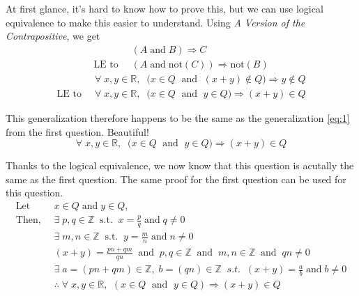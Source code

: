 At first glance, it's hard to know
how to prove this, but we can use
logical equivalence to make this
easier to understand.
Using \textit{A Version of the Contrapositive},
we get
\begin{align}
	&(A \; \text{and} \; B) \Rightarrow C
	\\
	\text{LE to} \;\;
	&(A \; \text{and} \; \text{not}(C)) \Rightarrow
	\text{not}(B)
\end{align}
\begin{align}
	&\forall \;
	x,y \in \mathbb{R}, \; \;
	\big( x \in Q \; \text{ and } \; (x + y) \notin Q \big)
	\Rightarrow
	y \notin Q
	\\
	\text{LE to} \;\;
	&\forall \;
	x,y \in \mathbb{R}, \; \;
	\big( x \in Q \; \text{ and } \; y \in Q \big)
	\Rightarrow
	(x + y) \in Q
\end{align}

This generalization therefore happens to be
the same as the generalization \eqref{eq:1}
from the first question. Beautiful!
\begin{equation*}
	\forall \;
	x,y \in \mathbb{R}, \; \;
	\big( x \in Q \; \text{ and } \; y \in Q \big)
	\Rightarrow
	(x+y) \in Q
\end{equation*}

Thanks to the logical equivalence,
we now know that this question is acutally
the same as the first question.
The same proof for the first question
can be used for this question.
\begin{align}
	\text{Let} \;\;
	&x \in Q \; \text{and} \; y \in Q,
	\\
	\text{Then,} \;\;
	&\exists \; p,q \in \mathbb{Z}
	\;\; \text{s.t.} \;\; x=\frac{p}{q}
	\; \text{and} \; q \neq 0
	\\
	&\exists \; m,n \in \mathbb{Z}
	\;\; \text{s.t.} \;\; y=\frac{m}{n}
	\; \text{and} \; n \neq 0
	\\
	&(x + y) = \frac{p n + q m}{q n}
	\;\; \text{and} \;\; 
	p,q \in \mathbb{Z}
	\;\; \text{and} \;\;
	m,n \in \mathbb{Z}
	\;\; \text{and} \;\;
	q n \neq 0
	\\
	&\exists \; a = (p n + q m)
	\in \mathbb{Z}, \;
	b = (q n)
	\in \mathbb{Z}
	\;\; s.t. \;\; (x + y) = \frac{a}{b} 
	\; \text{and} \; b \neq 0
	\\
	&\therefore \;
	\forall \;
	x,y \in \mathbb{R} \text{,} \; \;
	( x \in Q \; \text{ and } \; y \in Q )
	\Rightarrow
	(x+y) \in Q	
\end{align}